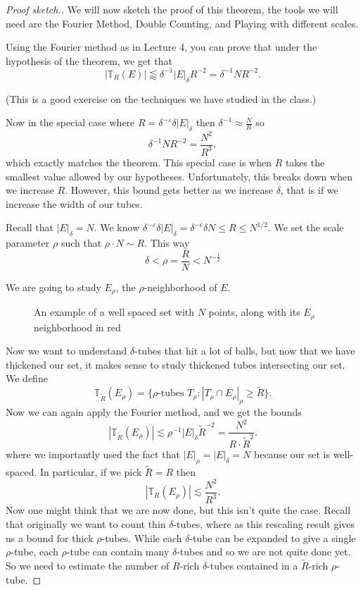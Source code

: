 \documentclass[12pt]{amsart}
\newcommand{\TT}{\mathbb{T}}
\begin{document}
\begin{proof} [Proof sketch.]
  We will now sketch the proof of this theorem, the tools we will need are the Fourier Method, Double Counting, and Playing with different scales.

  Using the Fourier method as in Lecture 4,   you can prove that under the hypothesis of the theorem, we get that
  \[
    |\TT_{R} (E)| \lessapprox \delta^{-1} |E|_\delta R^{-2} = \delta^{-1} N R^{-2}.
  \]
  
(This is a good exercise on the techniques we have studied in the class.)  
  
  Now in the special case where $R = \delta^{-\varepsilon} \delta |E|_\delta$ then $\delta^{-1} \approx \frac{N}{R}$ so
  \[
    \delta^{-1} N R^{-2} = \frac{N^2}{R^3},
  \]
  which exactly matches the theorem.    This special case is when $R$ takes the smallest value allowed by our hypotheses.  Unfortunately, this breaks down when we increase $R$. However, this bound gets better as we increase $\delta$, that is if we increase the width of our tubes. 
  
  Recall that $|E|_\delta = N$.  
 We know $\delta^{-\varepsilon} \delta |E|_\delta = \delta^{-\epsilon} \delta N  \leq R \leq N^{1/2}$.  We set the scale parameter $\rho$ such that $\rho \cdot N \sim R$. This way
  \[
    \delta < \rho = \frac{R}{N} < N^{-\frac{1}{2}}
  \]
  
  We are going to study $E_\rho$, the $\rho$-neighborhood of $E$.
\begin{figure}[h]
\centering
  
  \caption{An example of a well spaced set with $N$ points, along with its $E_\rho$ neighborhood in red}
\end{figure}
  Now we want to understand $\delta$-tubes that hit a lot of balls, but now that we have thickened our set, it makes sense to study thickened tubes intersecting our set.  We define
  \[
    \TT_{\tilde{R}} (E_\rho) = \{\rho \text{-tubes } T_\rho : |T_\rho \cap E_\rho|_\rho \geq \tilde{R} \}.
  \]
  Now we can again apply the Fourier method, and we get the bounds
  \[
    |\TT_{\tilde{R}} (E_\rho)| \lesssim \rho^{-1} |E|_{\delta} \tilde{R}^{-2} = \frac{N^2}{R \cdot \tilde{R}^2}.
  \]
  where we importantly used the fact that $|E|_\rho = |E|_\delta = N$ because our set is well-spaced. In particular, if we pick $\tilde{R} = R$ then
  \[
    |\TT_{R} (E_\rho)| \lesssim \frac{N^2}{R^3}.
  \]
  Now one might think that we are now done, but this isn't quite the case. Recall that originally we want to count thin $\delta$-tubes, where as this rescaling result gives us a bound for thick $\rho$-tubes. While each $\delta$-tube can be expanded to give a single $\rho$-tube, each $\rho$-tube can contain many $\delta$-tubes and so we are not quite done yet.   So we need to estimate the number of $R$-rich $\delta$-tubes contained in a $\tilde R$-rich $\rho$-tube.
  

\end{proof}
\end{document}
